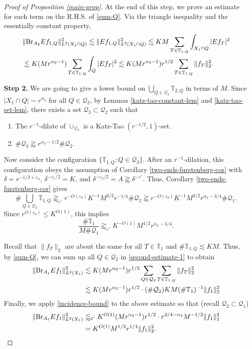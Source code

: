 \documentclass{amsart}
\numberwithin{equation}{section}
\newcommand{\al}{\alpha}
\newcommand{\de}{\delta}
\newcommand{\e}{\varepsilon}
\newcommand{\cq}{\mathcal Q}
\newcommand{\ZT}{\mathbb{T}}
\newcommand{\BR}{{\rm{Br}}}
\begin{document}
\begin{proof}[Proof of Proposition \ref{main-prop}]
\smallskip
At the end of this step, we prove an estimate for each term on the R.H.S. of \eqref{sum-Q}.
Via the triangle inequality and the essentially constant property,
\begin{align}
    &\|\BR_{A_2} Ef_{1,Q}\|_{L^2(X_1\cap Q)}^2\lesssim\|Ef_{1,Q}\|_{L^2(X_1\cap Q)}^2\lesssim KM\sum_{T\in\ZT_{1,Q}}\int_{X_1\cap Q}|Ef_T|^2\\ \label{second-estimate-1}
    &\lesssim K (M r^{\al_2-1})\sum_{T\in\ZT_{1,Q}}\int_{Q}|Ef_{T}|^2\lesssim K(M r^{\al_2-1})r^{1/2}\sum_{T\in \ZT_{1,Q}}\|f_T\|_2^2.
\end{align}

\medskip

{\bf Step 2.}
We are going to give a lower bound on $\bigcup_{Q\in\cq_2}\ZT_{2,Q}$ in terms of $M$.
Since $|X_1\cap Q|\sim r^{\al_2}$ for all $Q\in\cq_2$, by Lemmas \ref{katz-tao-constant-lem} and \ref{katz-tao-set-lem}, there exists a set $\cq_3\subset\cq_2$ such that 
\begin{enumerate}
    \item The $r^{-1}$-dilate of $\cup_{\cq_3}$ is a Katz-Tao $(r^{-1/2},1)$-set.
    \item $\#\cq_3\gtrapprox r^{\al_2-1/2}\#\cq_2$.
\end{enumerate}



Now consider the configuration $\{\ZT_{1,Q}:Q\in\cq_3\}$.
After an $r^{-1}$-dilation, this configuration obeys the assumption of Corollary \ref{two-ends-furstenberg-cor} with $\de=r^{-1/2+\e_0}$, $\de^{-\e_1/2}=K$, and $\de^{-\e_2/2}=A\gtrapprox\de^{-\e'}$.
Thus, Corollary \ref{two-ends-furstenberg-cor} gives 
\begin{equation}
    \#\bigcup_{Q\in\cq_3}\ZT_{1,Q}\gtrapprox_{\e'} r^{-O(\e_0)}K^{-1}M^{3/2}r^{-1/4}\#\cq_2\gtrapprox r^{-O(\e_0)}K^{-1}M^{3/2}r^{\al_2-3/4}\#\cq_1.
\end{equation}
Since $r^{O(\e_0)}\leq K^{O(1)}$, this implies 
\begin{equation}
\label{incidence-bound}
    \frac{\#\ZT_1}{M\#\cq_1}\gtrapprox_{\e'} K^{-O(1)}M^{1/2}r^{\al_2-3/4}.
\end{equation}

Recall that $\|f_T\|_2$ are about the same for all $T\in\ZT_1$ and $\#\ZT_{1,Q}\lesssim KM$.
Thus, by \eqref{sum-Q}, we can sum up all $Q\in\cq_2$ in \eqref{second-estimate-1} to obtain
\begin{align}
     \|\BR_{A_1} Ef_1\|_{L^2(X_1)}^2&\lesssim K(M r^{\al_2-1})r^{1/2}\sum_{Q\in\cq_2}\sum_{T\in \ZT_{1,Q}}\|f_T\|_2^2\\
     &\lesssim  K(M r^{\al_2-1})r^{1/2}\cdot (\#\cq_2)KM(\#\ZT_1)^{-1}\|f_1\|_2^2
\end{align}
Finally, we apply \eqref{incidence-bound} to the above estimate so that (recall $\cq_2\subset\cq_1$)
\begin{align}
\label{second-estimate-4}
    \|\BR_{A_1} Ef_1\|_{L^2(X_1)}^2&\lessapprox_{\e'}K^{O(1)}(M r^{\al_2-1})r^{1/2}\cdot r^{3/4-\al_2}M^{-1/2}\|f_1\|_2^2\\
    &= K^{O(1)} M^{1/2}r^{1/4}\|f_1\|_2^2.
\end{align}



\end{proof}
\end{document}
